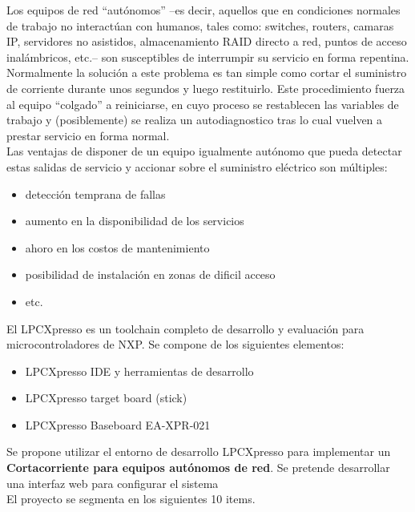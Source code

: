 \documentclass[a4paper,12pt]{article}
\begin{document}
Los equipos de red ``autónomos'' --es decir, aquellos que en condiciones normales de trabajo no interactúan con humanos, tales como: switches, routers, camaras IP, servidores no asistidos, almacenamiento RAID directo a red, puntos de acceso inalámbricos, etc.-- son susceptibles de interrumpir su servicio en forma repentina. Normalmente la solución a este problema es tan simple como cortar el suministro de corriente durante unos segundos y luego restituirlo. Este procedimiento fuerza al equipo ``colgado'' a reiniciarse, en cuyo proceso se restablecen las variables de trabajo y (posiblemente) se realiza un autodiagnostico tras lo cual vuelven a prestar servicio en forma normal.\\

Las ventajas de disponer de un equipo igualmente autónomo que pueda detectar estas salidas de servicio y accionar sobre el suministro eléctrico son múltiples:

\begin{itemize}
\item detección temprana de fallas
\item aumento en la disponibilidad de los servicios
\item ahoro en los costos de mantenimiento 
\item posibilidad de instalación en zonas de dificil acceso
\item etc.
\end{itemize}


El LPCXpresso es un toolchain completo de desarrollo y evaluación para microcontroladores de NXP.
Se compone de los siguientes elementos:
\begin{itemize}
\item LPCXpresso IDE y herramientas de desarrollo
\item LPCXpresso target board (stick)
\item LPCXpresso Baseboard EA-XPR-021
\end{itemize}

Se propone utilizar el entorno de desarrollo LPCXpresso para implementar un {\textbf{Cortacorriente para equipos autónomos de red}}. Se pretende desarrollar una interfaz web para configurar el sistema\\ 

El proyecto se segmenta en los siguientes 10 items.
\end{document}
